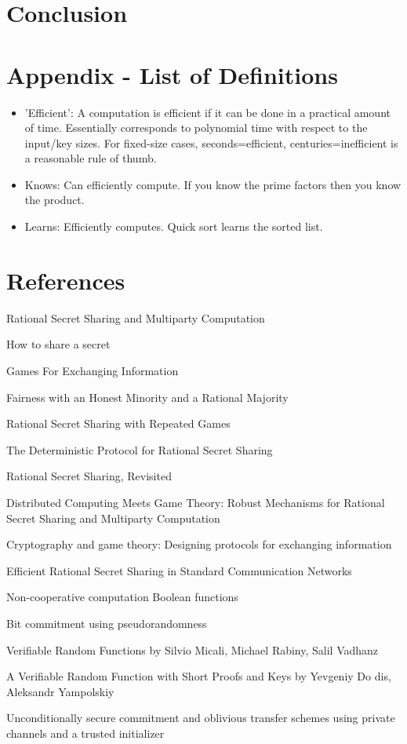 \documentclass{dalcsthesis}
\begin{document}
\chapter{Conclusion}



\chapter{Appendix - List of Definitions}

\begin{itemize}
  \item 'Efficient': A computation is efficient if it can be done in a practical amount of time. Essentially corresponds to polynomial time with respect to the input/key sizes. For fixed-size cases, seconds=efficient, centuries=inefficient is a reasonable rule of thumb.
  \item Knows: Can efficiently compute. If you know the prime factors then you know the product.
  \item Learns: Efficiently computes. Quick sort learns the sorted list.
\end{itemize}

\chapter{References}
\begin{thebibliography}{9}

 Rational Secret Sharing and Multiparty Computation

 How to share a secret

 Games For Exchanging Information

 Fairness with an Honest Minority and a Rational Majority

 Rational Secret Sharing with Repeated Games

\bibitem{} The Deterministic Protocol for Rational Secret Sharing

 Rational Secret Sharing, Revisited

 Distributed Computing Meets Game Theory: Robust Mechanisms for Rational Secret Sharing and Multiparty Computation

 Cryptography and game theory: Designing protocols for exchanging information

 Efficient Rational Secret Sharing in Standard Communication Networks

 Non-cooperative computation Boolean functions

 Bit commitment using pseudorandomness

 Verifiable Random Functions by Silvio Micali, Michael Rabiny, Salil Vadhanz

 A Verifiable Random Function with Short Proofs and Keys by Yevgeniy Do dis, Aleksandr Yampolskiy

 Unconditionally secure commitment and oblivious transfer schemes using private channels and a trusted initializer

\end{thebibliography}
\end{document}
